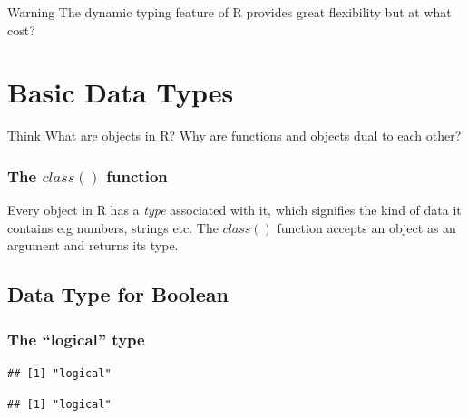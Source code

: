 \begin{DIY}{Warning}
The dynamic typing feature of R  provides great flexibility but at what cost?
\end{DIY}



\newpage
\section{Basic Data Types}
\begin{HIGHLIGHT}
\par{}
\end{HIGHLIGHT}

\begin{DIY}{Think}
What are objects in R? Why are functions and objects dual to each other? 
\end{DIY}

\subsubsection{The $class()$ function}
\noindent Every object in R has a \emph{type} associated with it, which signifies the kind of data it contains e.g numbers, strings etc. The $class()$ function accepts an object as an argument and returns its type.

\subsection{Data Type for Boolean}
\subsubsection{The ``logical'' type}
\begin{knitrout}
\color{fgcolor}\begin{kframe}
\begin{alltt}
\hlstd{(}\hlstd{)}
\end{alltt}
\begin{verbatim}
## [1] "logical"
\end{verbatim}
\begin{alltt}
\hlstd{(}\hlstd{)}
\end{alltt}
\begin{verbatim}
## [1] "logical"
\end{verbatim}
\end{kframe}
\end{knitrout}
